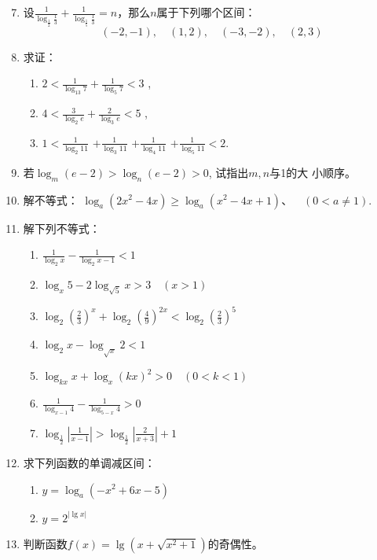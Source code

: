\begin{enumerate}\setcounter{enumi}{6}
    \item 设$\frac{1}{\log_{\tfrac{1}{2}}\frac{1}{3}}+\frac{1}{\log_{\tfrac{1}{5}}\frac{1}{3}}=n$，那么$n$属于下列哪个区间：
    \[(-2,-1),\quad (1,2),\quad (-3,-2),\quad (2,3)\]
\item 求证：
\begin{enumerate}[(1)]
\item $2< \frac 1{\log _{13}7}+ \frac 1{\log _{5}7}< 3$ ,

\item $4< \frac 3{\log _{2}e}+ \frac 2{\log _{3}e}< 5$ ,

\item $1< \frac 1{\log _{2}11}$ $+ \frac 1{\log _{3}11}$ $+ \frac 1{\log _{4}11}$ $+ \frac 1{\log _{5}11}< 2$.
\end{enumerate}
\item  若$\log_m(e-2)>\log_n(e-2)>0$, 试指出$m,n$与1的大
小顺序。
\item 解不等式：
$\log_{a}\left(2x^{2}-4x\right)\ge \log_{a}\left(x^{2}-4x+1\right)、\quad (0<a\neq1).$
\item 解下列不等式：
\begin{enumerate}[(1)]
    \item $\frac 1{\log _2x}- \frac 1{\log _2x- 1}< 1$
    \item $\log_{x}5- 2\log_{\sqrt {5}}x> 3\quad ( x> 1) $
    \item $\log_2\left(\frac23\right)^x+\log_2\left(\frac49\right)^{2x}<\log_2\left(\frac23\right)^5$
    \item $\log_2 x-\log_{\sqrt{x}}2<1 $
    \item $\log_{kx}x+\log_x (kx)^2>0\quad (0<k<1)$
    \item $\frac{1}{\log_{x-1}4}-\frac{1}{\log_{5-x}4}>0$
    \item $\log_{\tfrac{1}{2}}\left|\frac{1}{x-1}\right|>\log_{\tfrac{1}{2}}\left|\frac{2}{x+3}\right|+1$
\end{enumerate}

\item 求下列函数的单调减区间：
\begin{multicols}{2}
\begin{enumerate}[(1)]
    \item $y=\log_a (-x^2+6x-5)$
    \item $y=2^{|\lg x|}$
\end{enumerate}
\end{multicols}
\item 判断函数$f(x)=\lg\left(x+\sqrt{x^2+1}\right)$的奇偶性。
\end{enumerate}

